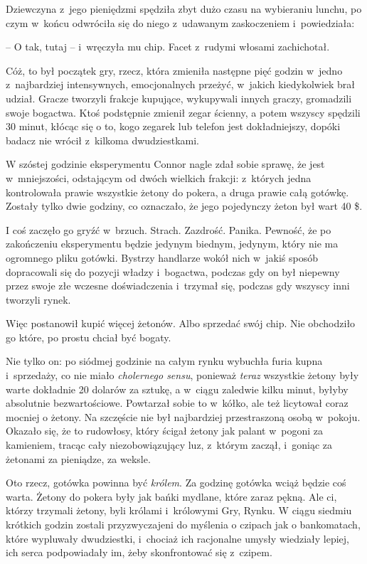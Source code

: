 \documentclass[oneside,polish,11pt,rmheadings]{mwbk}
\begin{document}
Dziewczyna z~jego pieniędzmi spędziła zbyt dużo czasu na wybieraniu lunchu, po czym w~końcu odwróciła się do niego z~udawanym zaskoczeniem i~powiedziała: 

-- O tak, tutaj -- i~wręczyła mu chip. Facet z~rudymi włosami zachichotał.

Cóż, to był początek gry, rzecz, która zmieniła następne pięć godzin w~jedno z~najbardziej intensywnych, emocjonalnych przeżyć, w~jakich kiedykolwiek brał udział. Gracze tworzyli frakcje kupujące, wykupywali innych graczy, gromadzili swoje bogactwa. Ktoś podstępnie zmienił zegar ścienny, a potem wszyscy spędzili 30 minut, kłócąc się o to, kogo zegarek lub telefon jest dokładniejszy, dopóki badacz nie wrócił z~kilkoma dwudziestkami.

W szóstej godzinie eksperymentu Connor nagle zdał sobie sprawę, że jest w~mniejszości, odstającym od dwóch wielkich frakcji: z~których jedna kontrolowała prawie wszystkie żetony do pokera, a druga prawie całą gotówkę. Zostały tylko dwie godziny, co oznaczało, że jego pojedynczy żeton był wart 40 \$.

I coś zaczęło go gryźć w~brzuch. Strach. Zazdrość. Panika. Pewność, że po zakończeniu eksperymentu będzie jedynym biednym, jedynym, który nie ma ogromnego pliku gotówki. Bystrzy handlarze wokół nich w~jakiś sposób dopracowali się do pozycji władzy i~bogactwa, podczas gdy on był niepewny przez swoje złe wczesne doświadczenia i~trzymał się, podczas gdy wszyscy inni tworzyli rynek.

Więc postanowił kupić więcej żetonów. Albo sprzedać swój chip. Nie obchodziło go które, po prostu chciał być bogaty.

Nie tylko on: po siódmej godzinie na całym rynku wybuchła furia kupna i~sprzedaży, co nie miało \textit{cholernego sensu}, ponieważ \textit{teraz }wszystkie żetony były warte dokładnie 20 dolarów za sztukę, a w~ciągu zaledwie kilku minut, byłyby absolutnie bezwartościowe. Powtarzał sobie to w~kółko, ale też licytował coraz mocniej o żetony. Na szczęście nie był najbardziej przestraszoną osobą w~pokoju. Okazało się, że to rudowłosy, który ścigał żetony jak palant w~pogoni za kamieniem, tracąc cały niezobowiązujący luz, z~którym zaczął, i~goniąc za żetonami za pieniądze, za weksle.

Oto rzecz, gotówka powinna być \textit{królem}. Za godzinę gotówka wciąż będzie coś warta. Żetony do pokera były jak bańki mydlane, które zaraz pękną. Ale ci, którzy trzymali żetony, byli królami i~królowymi Gry, Rynku. W ciągu siedmiu krótkich godzin zostali przyzwyczajeni do myślenia o czipach jak o bankomatach, które wypluwały dwudziestki, i~chociaż ich racjonalne umysły wiedziały lepiej, ich serca podpowiadały im, żeby skonfrontować się z~czipem.
\end{document}
